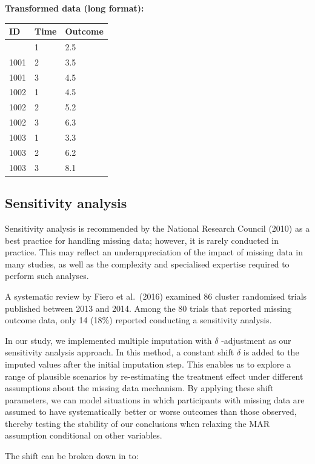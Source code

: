 \documentclass{article}
\begin{document}
\textbf{Transformed data (long format):}

\begin{longtable}[]{@{}lll@{}}
\toprule\noalign{}
ID & Time & Outcome \\
\midrule\noalign{}
\endhead
\bottomrule\noalign{}
\endlastfoot
1001 & 1 & 2.5 \\
1001 & 2 & 3.5 \\
1001 & 3 & 4.5 \\
1002 & 1 & 4.5 \\
1002 & 2 & 5.2 \\
1002 & 3 & 6.3 \\
1003 & 1 & 3.3 \\
1003 & 2 & 6.2 \\
1003 & 3 & 8.1 \\
\end{longtable}

\subsection{Sensitivity analysis}\label{sensitivity-analysis}

Sensitivity analysis is recommended by the National Research Council
(2010) as a best practice for handling missing data; however, it is
rarely conducted in practice. This may reflect an underappreciation of
the impact of missing data in many studies, as well as the complexity
and specialised expertise required to perform such analyses.

A systematic review by Fiero et al.~(2016) examined 86 cluster
randomised trials published between 2013 and 2014. Among the 80 trials
that reported missing outcome data, only 14 (18\%) reported conducting a
sensitivity analysis.

In our study, we implemented multiple imputation with \(\delta\)
-adjustment as our sensitivity analysis approach. In this method, a
constant shift \(\delta\) is added to the imputed values after the
initial imputation step. This enables us to explore a range of plausible
scenarios by re-estimating the treatment effect under different
assumptions about the missing data mechanism. By applying these shift
parameters, we can model situations in which participants with missing
data are assumed to have systematically better or worse outcomes than
those observed, thereby testing the stability of our conclusions when
relaxing the MAR assumption conditional on other variables.

The shift can be broken down in to:
\end{document}

